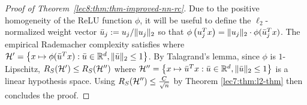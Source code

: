 \begin{proof}[Proof of Theorem~\ref{lec8:thm:thm-improved-nn-rc}]
Due to the positive homogeneity of the ReLU function $\phi$, it will be useful to define the $\ell_2$-normalized weight vector $\bar{u}_j := u_j / \|u_j\|_2$ so that $\phi\left(u_j^T x\right) = \|u_j\|_2 \cdot \phi(\bar{u}_j^T x)$. The empirical Rademacher complexity satisfies
\allowdisplaybreaks
{}
where $\mathcal H' = \left\{x \mapsto \phi(\bar{u}^T x) :  \bar{u} \in \mathbb{R}^d, \|\bar{u}\|_2 \leq 1 \right\}$. By Talagrand's lemma, since $\phi$ is $1$-Lipschitz, $R_S(\mathcal H') \leq R_S(\mathcal H'')$ where  $\mathcal H'' = \left\{x \mapsto \bar{u}^T x :  \bar{u} \in \mathbb{R}^d, \|\bar{u}\|_2 \leq 1 \right\}$ is a linear hypothesis space. Using $R_S(\mathcal H'') \leq \frac{C}{\sqrt{n}}$ by Theorem \ref{lec7:thm:l2-thm} then concludes the proof.

\end{proof}

